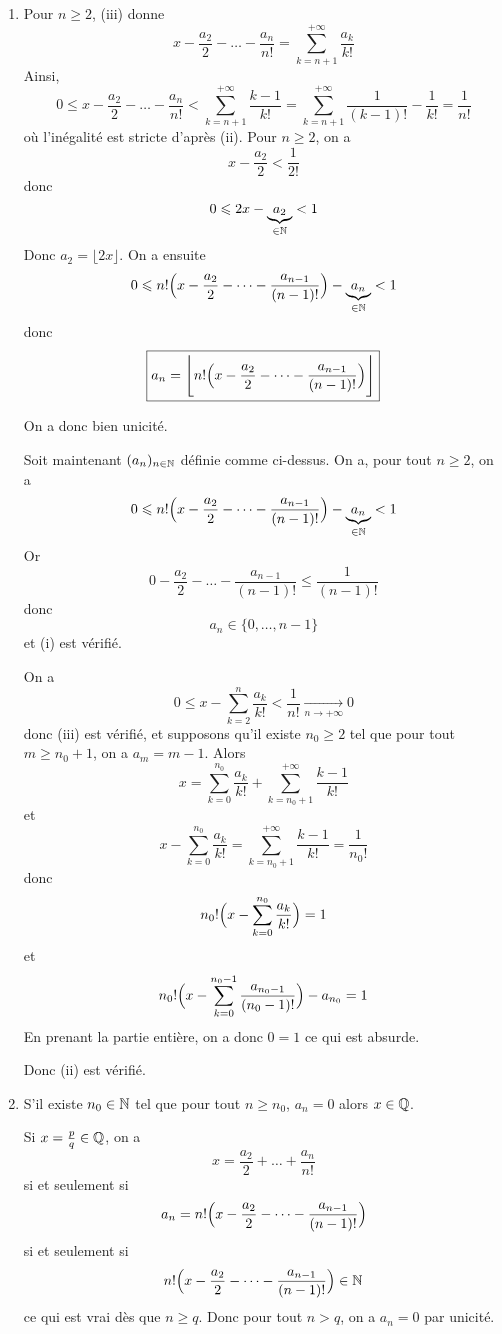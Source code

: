 \begin{solution}
	\phantom{}
	\begin{enumerate}
		\item Pour $n\geqslant2$, (iii) donne 
		$$x-\frac{a_{2}}{2}-\dots-\frac{a_{n}}{n!}=\sum_{k=n+1}^{+\infty}\frac{a_{k}}{k!}$$
		Ainsi,
		$$0\leqslant x-\frac{a_{2}}{2}-\dots-\frac{a_{n}}{n!}<\sum_{k=n+1}^{+\infty}\frac{k-1}{k!}=\sum_{k=n+1}^{+\infty}\frac{1}{(k-1)!}-\frac{1}{k!}=\frac{1}{n!}$$
		où l'inégalité est stricte d'après (ii). Pour $n\geqslant2$, on a 
		$$x-\frac{a_{2}}{2}<\frac{1}{2!}$$
		donc 
		$$0\leqslant 2x-\underbrace{a_{2}}_{\in\mathbb{N}}<1$$
		Donc $a_{2}=\lfloor 2x\rfloor$.
		On a ensuite 
		$$0\leqslant n!\Bigl(x-\frac{a_{2}}{2}-\dots-\frac{a_{n-1}}{(n-1)!}\Bigr)-\underbrace{a_{n}}_{\in\mathbb{N}}<1$$
		donc 
		$$\boxed{a_{n}=\Biggl\lfloor n!\Bigl(x-\frac{a_{2}}{2}-\dots-\frac{a_{n-1}}{(n-1)!}\Bigr)\Biggr\rfloor}$$

		On a donc bien unicité.

		Soit maintenant $(a_{n})_{n\in\mathbb{N}}$ définie comme ci-dessus. On a, pour tout $n\geqslant2$, on a 
		$$0\leqslant n!\Bigl(x-\frac{a_{2}}{2}-\dots-\frac{a_{n-1}}{(n-1)!}\Bigr)-\underbrace{a_{n}}_{\in\mathbb{N}}<1$$
		Or 
		$$0-\frac{a_{2}}{2}-\dots-\frac{a_{n-1}}{(n-1)!}\leqslant\frac{1}{(n-1)!}$$
		donc 
		$$a_{n}\in\{0,\dots,n-1\}$$
		et (i) est vérifié.

		On a 
		$$0\leqslant x-\sum_{k=2}^{n}\frac{a_{k}}{k!}<\frac{1}{n!}\xrightarrow[n\to+\infty]{}0$$
		donc (iii) est vérifié, et supposons qu'il existe $n_{0}\geqslant2$ tel que pour tout $m\geqslant n_{0}+1$, on a $a_{m}=m-1$.
		Alors 
		$$x=\sum_{k=0}^{n_{0}}\frac{a_{k}}{k!}+\sum_{k=n_{0}+1}^{+\infty}\frac{k-1}{k!}$$
		et
		$$x-\sum_{k=0}^{n_{0}}\frac{a_{k}}{k!} = \sum_{k=n_{0}+1}^{+\infty}\frac{k-1}{k!}=\frac{1}{n_{0}!}$$
		donc 
		$$n_{0}!\Bigl(x-\sum_{k=0}^{n_{0}}\frac{a_{k}}{k!}\Bigr)=1$$
		et 
		$$n_{0}!\Bigl(x-\sum_{k=0}^{n_{0}-1}\frac{a_{n_{0}-1}}{(n_{0}-1)!}\Bigr)-a_{n_{0}}=1$$
		En prenant la partie entière, on a donc $0=1$ ce qui est absurde.

		Donc (ii) est vérifié.
	
		\item S'il existe $n_{0}\in\mathbb{N}$ tel que pour tout $n\geqslant n_{0}$, $a_{n}=0$ alors $x\in\mathbb{Q}$.
		
		Si $x=\frac{p}{q}\in\mathbb{Q}$, on a 
		$$x=\frac{a_{2}}{2}+\dots+\frac{a_{n}}{n!}$$
		si et seulement si 
		$$a_{n}=n!\Bigl(x-\frac{a_{2}}{2}-\dots-\frac{a_{n-1}}{(n-1)!}\Bigr)$$
		si et seulement si 
		$$n!\Bigl(x-\frac{a_{2}}{2}-\dots-\frac{a_{n-1}}{(n-1)!}\Bigr)\in\mathbb{N}$$
		ce qui est vrai dès que $n\geqslant q$. Donc pour tout $n > q$, on a $a_{n}=0$ par unicité.


\end{enumerate}
\end{solution}
